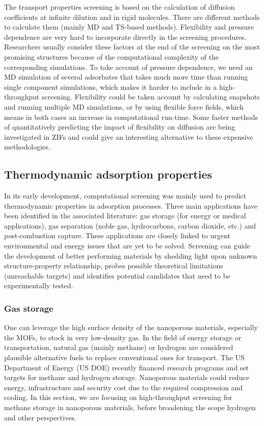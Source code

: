 \documentclass[main.tex]{subfiles}
\begin{document}
The transport properties screening is based on the calculation of diffusion coefficients at infinite dilution and in rigid molecules. There are different methods to calculate them (mainly MD and TS-based methods). Flexibility and pressure dependence are very hard to incorporate directly in the screening procedures. Researchers usually consider these factors at the end of the screening on the most promising structures because of the computational complexity of the corresponding simulations. {To take account of} pressure dependence, {we need} an MD simulation of several adsorbates { that takes much more time than running single component simulations},\autocite{Keskin_2007, Keskin_2009} which {makes it harder to include in a} high-throughput screening. Flexibility could be taken account by calculating snapshots and running multiple MD simulations, or by using flexible force fields, which means in both cases an increase in computational run-time. Some faster methods of quantitatively predicting the impact of flexibility on diffusion are being investigated in ZIFs and could give an interesting alternative to these expensive methodologies.\autocite{Han_2020}

\subsection{Thermodynamic adsorption properties}

In its early development, computational screening was mainly used to predict thermodynamic properties in adsorption processes. Three main applications have been identified in the associated literature: gas storage (for energy or medical applications), gas separation (noble gas, hydrocarbons, carbon dioxide, etc.) and post-combustion  capture. These applications are closely linked to urgent environmental and energy issues that are yet to be solved. Screening can guide the development of better performing materials by shedding light upon unknown structure-property relationship, probes possible theoretical limitations (unreachable targets) and identifies potential candidates that need to be experimentally tested.

\subsubsection{Gas storage}

One can leverage the high surface density of the nanoporous materials, especially the MOFs, to stock in very low-density gas. In the field of energy storage or transportation, natural gas (mainly methane) or hydrogen are considered plausible alternative fuels to replace conventional ones for transport. The US Department of Energy (US DOE) recently financed research programs and set targets for methane and hydrogen storage. Nanoporous materials could reduce energy, infrastructure and security cost due to the required compression and cooling. In this section, we are focusing on high-throughput screening for methane storage in nanoporous materials, before broadening the scope hydrogen and other perspectives.
\end{document}

